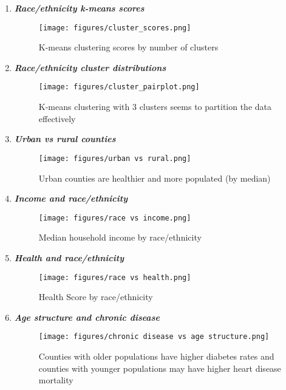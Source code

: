 \documentclass{article}
\begin{document}
\begin{itemize}[leftmargin=0pt]
\begin{enumerate}
    \pagebreak
    \item \textbf{\textit{Race/ethnicity k-means scores}}
            \label{fig:kmeans_scores}
        \begin{figure}[h!]
            \centering
            \texttt{[image: figures/cluster\_scores.png]}
            \caption{K-means clustering scores by number of clusters}
        \end{figure}

    \pagebreak
    \item \textbf{\textit{Race/ethnicity cluster distributions}}
             \label{fig:kmeans_pairplot}
       \begin{figure}[h!]
            \centering
            \texttt{[image: figures/cluster\_pairplot.png]}
            \caption{K-means clustering with 3 clusters seems to partition the data effectively}
        \end{figure}

    \pagebreak
    \item \textbf{\textit{Urban vs rural counties}}
            \label{fig:urban_rural}
        \begin{figure}[h!]
            \centering
            \texttt{[image: figures/urban vs rural.png]}
            \caption{Urban counties are healthier and more populated (by median)}
        \end{figure}

    \pagebreak
    \item \textbf{\textit{Income and race/ethnicity}}
            \label{fig:income_race}
        \begin{figure}[h!]
            \centering
            \texttt{[image: figures/race vs income.png]}
            \caption{Median household income by race/ethnicity}
        \end{figure}

    \pagebreak
    \item \textbf{\textit{Health and race/ethnicity}}
            \label{fig:health_race}
        \begin{figure}[h!]
            \centering
            \texttt{[image: figures/race vs health.png]}
            \caption{Health Score by race/ethnicity}
        \end{figure}

    \pagebreak
    \item \textbf{\textit{Age structure and chronic disease}}
            \label{fig:age_chronic}
        \begin{figure}[h!]
            \centering
            \texttt{[image: figures/chronic disease vs age structure.png]}
            \caption{Counties with older populations have higher diabetes rates and counties with younger populations may have higher heart disease mortality}
        \end{figure}


\end{enumerate}
\end{itemize}
\end{document}
